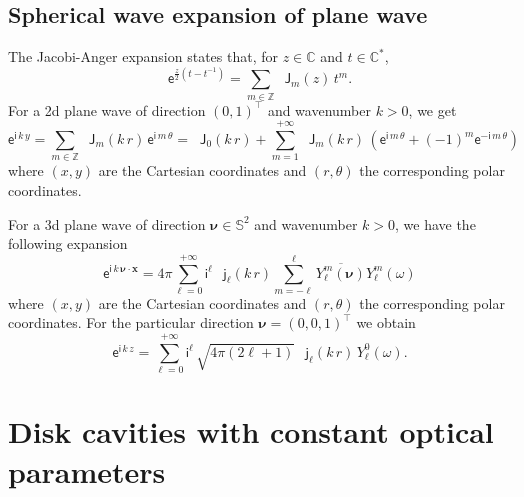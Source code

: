 \documentclass[12pt,a4paper]{article}
\theoremstyle{definition}
\theoremstyle{plain}
\theoremstyle{remark}
\newcommand{\bbC}{\mathbb{C}}
\newcommand{\bbS}{\mathbb{S}}
\newcommand{\bbZ}{\mathbb{Z}}
\newcommand{\ex}{\mathsf{e}}
\newcommand{\im}{\mathsf{i}}
\newcommand{\bJ}{\mathop{}\!\mathsf{J}}
\newcommand{\bj}{\mathop{}\!\mathsf{j}}
\newcommand{\plr}[1]{\left(#1\right)}
\newcommand{\vect}[1]{\boldsymbol{#1}}
\newcommand{\vx}{\boldsymbol{x}}
\begin{document}
\subsection{Spherical wave expansion of plane wave}\label{sec:plane_wave_expan}

The Jacobi-Anger expansion \cite[Eq.~10.12.1]{NIST:DLMF} states that, for $z \in \bbC$ and $t \in \bbC^*$,
\[
    \ex^{\frac{z}{2}(t-t^{-1})} = \sum_{m \in \bbZ} \bJ_m(z)\, t^m.
\]
For a 2d plane wave of direction $(0, 1)^\intercal$ and wavenumber $k > 0$, we get
\begin{equation}\label{eq:wave_expan_2}
    \ex^{\im\, k\, y} = \sum_{m \in \bbZ} \bJ_m(k\, r)\, \ex^{\im\, m\, \theta}
    = \bJ_0(k\, r) + \sum_{m = 1}^{+\infty} \bJ_m(k\, r)\, \plr{\ex^{\im\, m\, \theta} + (-1)^m\ex^{-\im\, m\, \theta}}
\end{equation}
where $(x, y)$ are the Cartesian coordinates and $(r, \theta)$ the corresponding polar coordinates.

\bigskip

For a 3d plane wave of direction $\vect{\nu} \in \bbS^2$ and wavenumber $k > 0$, we have the following expansion
\[
    \ex^{\im\, k\, \vect{\nu} \cdot \vx} = 4\pi \sum_{\ell = 0}^{+\infty} \im^\ell\, \bj_\ell(k\, r) \sum_{m = -\ell}^\ell \overline{Y_\ell^m(\vect{\nu})} Y_\ell^m(\omega)
\]
where $(x, y)$ are the Cartesian coordinates and $(r, \theta)$ the corresponding polar coordinates.
For the particular direction $\vect{\nu} = (0, 0, 1)^\intercal$ we obtain
\begin{equation}\label{eq:wave_expan_3}
    \ex^{\im\, k\, z} = \sum_{\ell = 0}^{+\infty} \im^\ell \,\sqrt{4\pi(2\ell+1)}\, \bj_\ell(k\, r)\, Y_\ell^0(\omega).
\end{equation}




\newpage

\section{Disk cavities with constant optical parameters}
\end{document}

